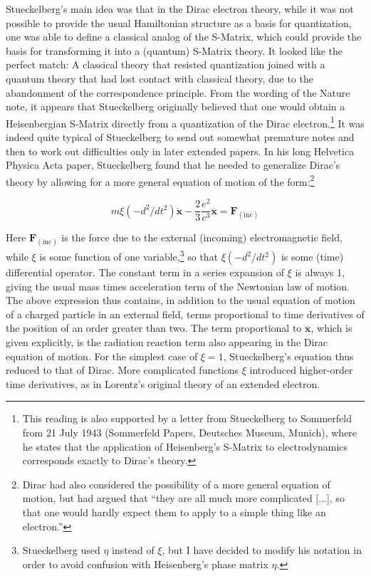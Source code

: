 \documentclass[12pt,a4paper]{article}
\begin{document}
Stueckelberg's main idea was that in the Dirac electron theory, while it was not possible to provide the usual Hamiltonian structure as a basis for quantization, one was able to define a classical analog of the S-Matrix, which could provide the basis for transforming it into a (quantum) S-Matrix theory. It looked like the perfect match: A classical theory that resisted quantization joined with a quantum theory that had lost contact with classical theory, due to the abandonment of the correspondence principle. From the wording of the Nature note, it appears that Stueckelberg originally believed that one would obtain a Heisenbergian S-Matrix directly from a quantization of the Dirac electron.\footnote{This reading is also supported by a letter from Stueckelberg to Sommerfeld from 21 July 1943 (Sommerfeld Papers, Deutsches Museum, Munich), where he states that the application of Heisenberg's S-Matrix to electrodynamics corresponds exactly to Dirac's theory.} It was indeed quite typical of Stueckelberg to send out somewhat premature notes and then to work out difficulties only in later extended papers. In his long Helvetica Physica Acta paper, Stueckelberg found that he needed to generalize Dirac's theory by allowing for a more general equation of motion of the form:\footnote{Dirac had also considered the possibility of a more general equation of motion, but had argued that ``they are all much more complicated [...], so that one would hardly expect them to apply to a simple thing like an electron.''}

\begin{equation}
\label{eq:models}
m \xi \left( - d^2/dt^2 \right) \ddot{\mathbf{x}} - \frac{2}{3} \frac{e^2}{c^3} \dddot{\mathbf{x}} = \mathbf{F}_{(\mathrm{inc})}
\end{equation}

Here $\mathbf{F}_{(\mathrm{inc})}$ is the force due to the external (incoming) electromagnetic field, while $\xi$ is some function of one variable,\footnote{Stueckelberg used $\eta$ instead of $\xi$, but I have decided to modify his notation in order to avoid confusion with Heisenberg's phase matrix $\eta$.} so that $\xi \left( - d^2/dt^2 \right)$ is some (time) differential operator. The constant term in a series expansion of $\xi$ is always 1, giving the usual mass times acceleration term of the Newtonian law of motion. The above expression thus contains, in addition to the usual equation of motion of a charged particle in an external field, terms proportional to time derivatives of the position of an order greater than two. The term proportional to $\dddot{\mathbf{x}}$, which is given explicitly, is the radiation reaction term also appearing in the Dirac equation of motion. For the simplest case of $\xi = 1$, Stueckelberg's equation thus reduced to that of Dirac. More complicated functions $\xi$ introduced higher-order time derivatives, as in Lorentz's original theory of an extended electron.
\end{document}
